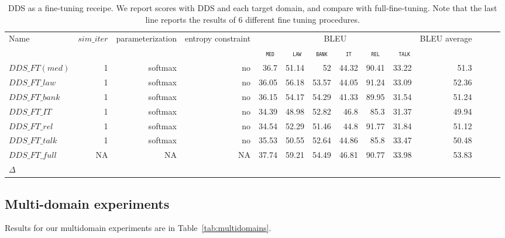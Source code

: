 \documentclass[11pt,a4paper]{article}
\newcommand{\fyTodo}[1]{\Todo[FY:]{\textcolor{orange}{#1}}}
\newcommand{\domain}[1]{\texttt{\textsc{#1}}}
\newcommand{\system}[1]{\texttt{{#1}}}
\begin{document}
\begin{table*}[htb]
  \centering%
  \begin{adjustbox}{width=1.0\textwidth,center}
  \begin{tabular}{|p{3.0cm}|*{13}{r|}} \hline
    \multirow{2}{*}{Name} & \multirow{2}{*}{$sim\_iter$} & \multirow{2}{*}{parameterization} & \multirow{2}{*}{entropy constraint} & \multicolumn{6}{|c|}{BLEU} & \multirow{2}{*}{BLEU average} \\ \cline{5-10}	
   & & & & \multicolumn{1}{c|}{\domain{ med}} & \multicolumn{1}{c|}{\domain{ law}} & \multicolumn{1}{c|}{\domain{bank}} & \multicolumn{1}{c|}{\domain{it}} & \multicolumn{1}{c|}{\domain{ rel }} & \multicolumn{1}{c|}{\domain{ talk}} &  \\
    \hline
  \system{$DDS\_FT (med)$} & 1 & softmax & no & 36.7&51.14&52&44.32&90.41&33.22&51.3\\
  \system{$DDS\_FT\_law$} & 1 & softmax & no &36.05&56.18&53.57&44.05&91.24&33.09&52.36\\
  \system{$DDS\_FT\_bank$} & 1 & softmax & no &36.15&54.17&54.29&41.33&89.95&31.54&51.24 \\
  \system{$DDS\_FT\_IT$} & 1 & softmax & no &34.39&48.98&52.82&46.8&85.3&31.37&49.94 \\
  \system{$DDS\_FT\_rel$} & 1 & softmax & no & 34.54&52.29&51.46&44.8&91.77&31.84&51.12\\
  \system{$DDS\_FT\_talk$} & 1 & softmax & no & 35.53&50.55&52.64&44.86&85.8&33.47&50.48\\
  \system{$DDS\_FT\_full$} & NA & NA & NA & 37.74&59.21	&54.49&46.81&90.77&33.98&53.83\\
    \hline
    $\Delta$ & \\
  \end{tabular}
  \end{adjustbox}
  \caption{DDS as a fine-tuning receipe. We report scores with DDS and each target domain, and compare with full-fine-tuning. Note that the last line reports the results of 6 different fine tuning procedures.}
  \label{tab:finetuning}
\end{table*}
\fyTodo{Works best for small domains ?}
\fyTodo{Curves for bank / medical ou law}

\fyTodo{Fine tune pour 2 domains}


\subsection{Multi-domain experiments}
Results for our multidomain experiments are in Table~\ref{tab:multidomains}.
\end{document}
